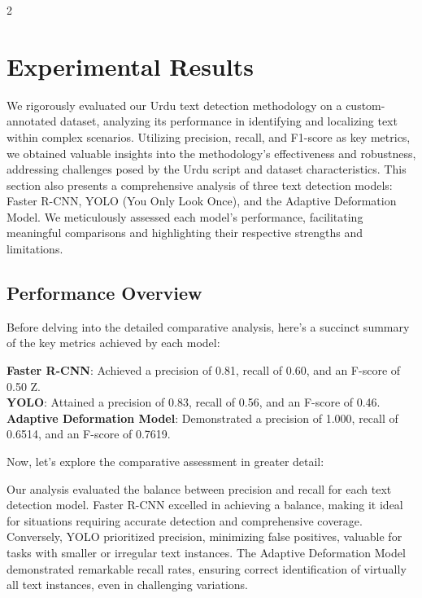 \documentclass[sn-mathphys,Numbered]{sn-jnl}%
\begin{document}
\begin{multicols}{2}
\section{Experimental Results}
We rigorously evaluated our Urdu text detection methodology on a custom-annotated dataset, analyzing its performance in identifying and localizing text within complex scenarios. Utilizing precision, recall, and F1-score as key metrics, we obtained valuable insights into the methodology's effectiveness and robustness, addressing challenges posed by the Urdu script and dataset characteristics. This section also presents a comprehensive analysis of three text detection models: Faster R-CNN, YOLO (You Only Look Once), and the Adaptive Deformation Model. We meticulously assessed each model's performance, facilitating meaningful comparisons and highlighting their respective strengths and limitations.


\subsection{Performance Overview}

Before delving into the detailed comparative analysis, here's a succinct summary of the key metrics achieved by each model:

\textbf{Faster R-CNN}: Achieved a precision of 0.81, recall of 0.60, and an F-score of 0.50
Z. \\
\textbf{YOLO}: Attained a precision of 0.83, recall of 0.56, and an F-score of 0.46. \\
\textbf{Adaptive Deformation Model}: Demonstrated a precision of 1.000, recall of 0.6514, and an F-score of 0.7619.

Now, let's explore the comparative assessment in greater detail:

Our analysis evaluated the balance between precision and recall for each text detection model. Faster R-CNN excelled in achieving a balance, making it ideal for situations requiring accurate detection and comprehensive coverage. Conversely, YOLO prioritized precision, minimizing false positives, valuable for tasks with smaller or irregular text instances. The Adaptive Deformation Model demonstrated remarkable recall rates, ensuring correct identification of virtually all text instances, even in challenging variations.


\end{multicols}
\end{document}
